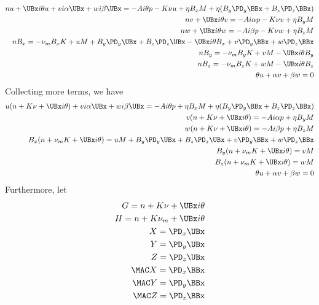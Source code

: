 \documentclass[11pt]{article}
\begin{document}
\begin{equation}\begin{aligned}
n u+ \UBx i\theta u + v i \alpha \UBx + w i \beta \UBx = -A i \theta p -K \nu u + \eta B_x M + \eta (B_y \PD_y \BBx + B_z \PD_z \BBx) \\
n v+ \UBx i\theta v                                    = -A i \alpha p -K \nu v + \eta B_y M \\
n w+ \UBx i\theta w                                    = -A i \beta  p -K \nu w + \eta B_z M \\
n B_x = -\nu_m B_x K + u M +B_y \PD_y \UBx +B_z \PD_z \UBx - \UBx i\theta B_x + v \PD_y \BBx +w \PD_z \BBx \\
n B_y = -\nu_m B_y K + v M                                 - \UBx i\theta B_y                                         \\
n B_z = -\nu_m B_z K + w M                                 - \UBx i\theta B_z                                         \\
\theta u +  \alpha v +  \beta w = 0 \\
\end{aligned} \end{equation}
Collecting more terms, we have
\begin{equation}\begin{aligned}
u(n + K \nu + \UBx i\theta) + v i \alpha \UBx + w i \beta \UBx = -A i \theta p + \eta B_x M + \eta (B_y \PD_y \BBx + B_z \PD_z \BBx) \\
v(n + K \nu + \UBx i\theta)                                    = -A i \alpha p + \eta B_y M \\
w(n + K \nu + \UBx i\theta)                                    = -A i \beta  p + \eta B_z M \\
B_x(n + \nu_m K + \UBx i\theta) = u M +B_y \PD_y \UBx +B_z \PD_z \UBx + v \PD_y \BBx +w \PD_z \BBx \\
B_y(n + \nu_m K + \UBx i\theta) = v M                                                                         \\
B_z(n + \nu_m K + \UBx i\theta) = w M                                                                         \\
\theta u +  \alpha v +  \beta w = 0 \\
\end{aligned} \end{equation}
Furthermore, let
\begin{equation}\begin{aligned}
G = n + K \nu   + \UBx i\theta \\
H = n + K \nu_m + \UBx i\theta \\
X = \PD_x \UBx \\
Y = \PD_y \UBx \\
Z = \PD_z \UBx \\
\MAC X = \PD_x \BBx \\
\MAC Y = \PD_y \BBx \\
\MAC Z = \PD_z \BBx \\
\end{aligned} \end{equation}
\end{document}
